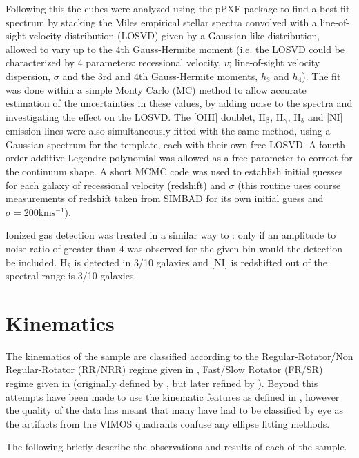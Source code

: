 \documentclass[fleqn,usenatbib,useAMS]{mnras}
\begin{document}
		Following this the cubes were analyzed using the pPXF package \citep{Cappellari2004} to find a best fit spectrum by stacking the Miles empirical stellar spectra \citep{Sanchez-Blazquez2006} convolved with a line-of-sight velocity distribution (LOSVD) given by a Gaussian-like distribution, allowed to vary up to the 4th Gauss-Hermite moment (i.e. the LOSVD could be characterized by 4 parameters: recessional velocity, $v$; line-of-sight velocity dispersion, $\sigma$ and the 3rd and 4th Gauss-Hermite moments, $h_3$ and $h_4$). The fit was done within a simple Monty Carlo (MC) method to allow accurate estimation of the uncertainties in these values, by adding noise to the spectra and investigating the effect on the LOSVD. The [OIII] doublet, H$_\mathrm{\beta}$, H$_\mathrm{\gamma}$, H$_\mathrm{\delta}$ and [NI] emission lines were also simultaneously fitted with the same method, using a Gaussian spectrum for the template, each with their own free LOSVD. A fourth order additive Legendre polynomial was allowed as a free parameter to correct for the continuum shape. A short MCMC code was used to establish initial guesses for each galaxy of recessional velocity (redshift) and $\sigma$ (this routine uses course measurements of redshift taken from SIMBAD \citep{Wenger2000} for its own initial guess and $\sigma = 200 \mathrm{km s^{-1}}$).

		Ionized gas detection was treated in a similar way to \citet{Sarzi2005}: only if an amplitude to noise ratio of greater than 4 was observed for the given bin would the detection be included. H$_\mathrm{\delta}$ is detected in 3/10 galaxies and [NI] is redshifted out of the spectral range is 3/10 galaxies.



\section{Kinematics}
	\label{sec:kine}
	The kinematics of the sample are classified according to the Regular-Rotator/Non Regular-Rotator (RR/NRR) regime given in \citet{Krajnovic2011}, Fast/Slow Rotator (FR/SR) regime given in \citet{Cappellari2016} (originally defined by \citet{Emsellem2011}, but later refined by \citet{Cappellari2016}). Beyond this attempts have been made to use the kinematic features as defined in \citet{Krajnovic2011}, however the quality of the data has meant that many have had to be classified by eye as the artifacts from the VIMOS quadrants confuse any ellipse fitting methods. 

	The following briefly describe the observations and results of each of the sample. %
\end{document}
